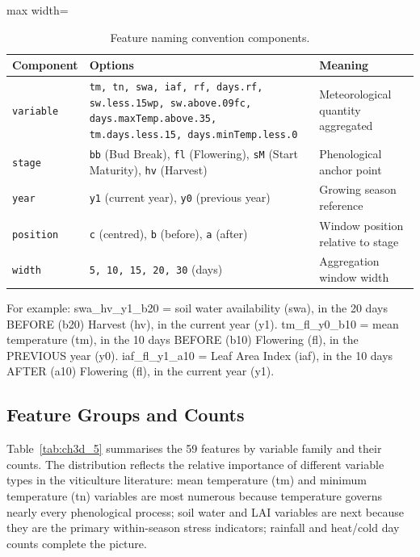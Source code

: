 \begin{table}[htbp]
  \centering
  \caption{Feature naming convention components.}\label{tab:ch3d_4}
  \small
  \begin{adjustbox}{max width=\textwidth}
    \begin{tabularx}{\textwidth}{p{1.8cm}|X|p{4.5cm}}
  \toprule
  \textbf{Component} & \textbf{Options} & \textbf{Meaning} \\
  \midrule
  \texttt{variable} & \texttt{tm, tn, swa, iaf, rf, days.rf, sw.less.15wp, sw.above.09fc, days.maxTemp.above.35, tm.days.less.15, days.minTemp.less.0} & Meteorological quantity aggregated \\[4pt]
  \texttt{stage} & \texttt{bb} (Bud Break), \texttt{fl} (Flowering), \texttt{sM} (Start Maturity), \texttt{hv} (Harvest) & Phenological anchor point \\[4pt]
  \texttt{year} & \texttt{y1} (current year), \texttt{y0} (previous year) & Growing season reference \\[4pt]
  \texttt{position} & \texttt{c} (centred), \texttt{b} (before), \texttt{a} (after) & Window position relative to stage \\[4pt]
  \texttt{width} & \texttt{5, 10, 15, 20, 30} (days) & Aggregation window width \\
  \bottomrule
\end{tabularx}
  \end{adjustbox}

\end{table}


For example: swa\_hv\_y1\_b20 = soil water availability (swa), in the 20 days BEFORE (b20) Harvest (hv), in the current year (y1). tm\_fl\_y0\_b10 = mean temperature (tm), in the 10 days BEFORE (b10) Flowering (fl), in the PREVIOUS year (y0). iaf\_fl\_y1\_a10 = Leaf Area Index (iaf), in the 10 days AFTER (a10) Flowering (fl), in the current year (y1).


\subsection{Feature Groups and Counts}\label{sub:feature_groups_and_counts}

Table~\ref{tab:ch3d_5} summarises the 59 features by variable family and their counts. The distribution reflects the relative importance of different variable types in the viticulture literature: mean temperature (tm) and minimum temperature (tn) variables are most numerous because temperature governs nearly every phenological process; soil water and LAI variables are next because they are the primary within-season stress indicators; rainfall and heat/cold day counts complete the picture.

